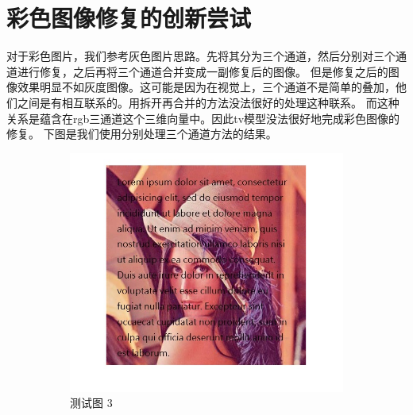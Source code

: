 \documentclass[UTF8]{ctexart}
\begin{document}
\section{彩色图像修复的创新尝试}
对于彩色图片，我们参考灰色图片思路。先将其分为三个通道，然后分别对三个通道进行修复，之后再将三个通道合并变成一副修复后的图像。
但是修复之后的图像效果明显不如灰度图像。这可能是因为在视觉上，三个通道不是简单的叠加，他们之间是有相互联系的。用拆开再合并的方法没法很好的处理这种联系。
而这种关系是蕴含在rgb三通道这个三维向量中。因此tv模型没法很好地完成彩色图像的修复。
下图是我们使用分别处理三个通道方法的结果。
\begin{figure}[H]
    \centering
    \begin{subfigure}[b]{0.3\textwidth}
        \includegraphics[width=\textwidth]{test3.jpg} %
        \caption{测试图 3}
        \label{fig:test2}
    \end{subfigure}
    \hfill
    \begin{subfigure}[b]{0.3\textwidth}

\end{subfigure}
\end{figure}
\end{document}
